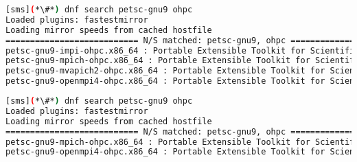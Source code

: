\begin{lstlisting}[language=bash,keywords={}]
[sms](*\#*) dnf search petsc-gnu9 ohpc
Loaded plugins: fastestmirror
Loading mirror speeds from cached hostfile
=========================== N/S matched: petsc-gnu9, ohpc ===========================
petsc-gnu9-impi-ohpc.x86_64 : Portable Extensible Toolkit for Scientific Computation
petsc-gnu9-mpich-ohpc.x86_64 : Portable Extensible Toolkit for Scientific Computation
petsc-gnu9-mvapich2-ohpc.x86_64 : Portable Extensible Toolkit for Scientific Computation
petsc-gnu9-openmpi4-ohpc.x86_64 : Portable Extensible Toolkit for Scientific Computation
\end{lstlisting}
\fi

\begin{lstlisting}[language=bash,keywords={}]
[sms](*\#*) dnf search petsc-gnu9 ohpc
Loaded plugins: fastestmirror
Loading mirror speeds from cached hostfile
=========================== N/S matched: petsc-gnu9, ohpc ===========================
petsc-gnu9-mpich-ohpc.x86_64 : Portable Extensible Toolkit for Scientific Computation
petsc-gnu9-openmpi4-ohpc.x86_64 : Portable Extensible Toolkit for Scientific Computation
\end{lstlisting}
\fi


